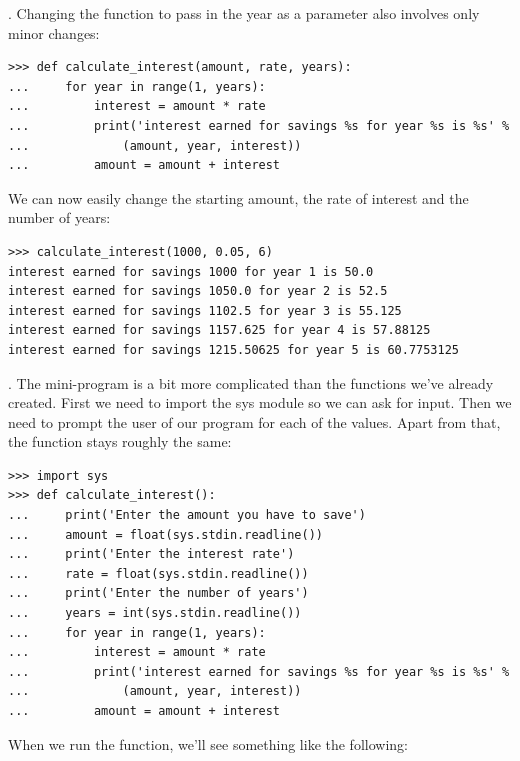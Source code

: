 . Changing the function to pass in the year as a parameter also involves only minor changes:

\begin{listing}
\begin{verbatim}
>>> def calculate_interest(amount, rate, years):
...     for year in range(1, years):
...         interest = amount * rate
...         print('interest earned for savings %s for year %s is %s' %
...             (amount, year, interest))
...         amount = amount + interest
\end{verbatim}
\end{listing}

\noindent
We can now easily change the starting amount, the rate of interest and the number of years:

\begin{listing}
\begin{verbatim}
>>> calculate_interest(1000, 0.05, 6)
interest earned for savings 1000 for year 1 is 50.0
interest earned for savings 1050.0 for year 2 is 52.5
interest earned for savings 1102.5 for year 3 is 55.125
interest earned for savings 1157.625 for year 4 is 57.88125
interest earned for savings 1215.50625 for year 5 is 60.7753125
\end{verbatim}
\end{listing}

. The mini-program is a bit more complicated than the functions we've already created.  First we need to import the sys module so we can ask for input.  Then we need to prompt the user of our program for each of the values.  Apart from that, the function stays roughly the same:

\begin{listing}
\begin{verbatim}
>>> import sys
>>> def calculate_interest():
...     print('Enter the amount you have to save')
...     amount = float(sys.stdin.readline())
...     print('Enter the interest rate')
...     rate = float(sys.stdin.readline())
...     print('Enter the number of years')
...     years = int(sys.stdin.readline())
...     for year in range(1, years):
...         interest = amount * rate
...         print('interest earned for savings %s for year %s is %s' % 
...             (amount, year, interest))
...         amount = amount + interest
\end{verbatim}
\end{listing}

\noindent
When we run the function, we'll see something like the following:

